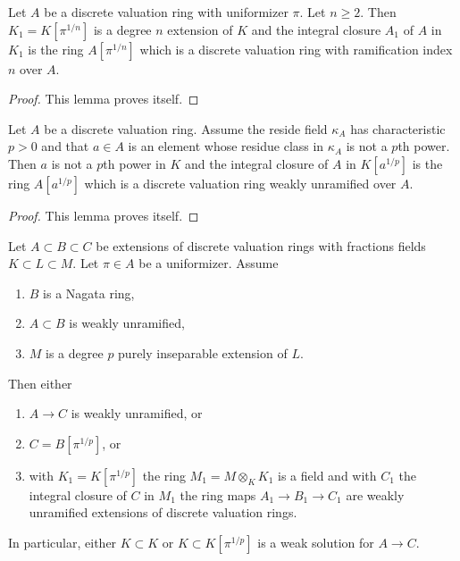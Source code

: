 \begin{lemma}
\label{lemma-pull-root-uniformizer}
Let $A$ be a discrete valuation ring with uniformizer $\pi$.
Let $n \geq 2$. Then $K_1 = K[\pi^{1/n}]$ is a degree $n$ extension of $K$
and the integral closure $A_1$ of $A$ in $K_1$ is the ring $A[\pi^{1/n}]$
which is a discrete valuation ring with ramification index $n$ over $A$.
\end{lemma}

\begin{proof}
This lemma proves itself.
\end{proof}

\begin{lemma}
\label{lemma-pre-purely-inseparable-case}
Let $A$ be a discrete valuation ring. Assume the reside field $\kappa_A$ has
characteristic $p > 0$ and that $a \in A$ is an element whose residue
class in $\kappa_A$ is not a $p$th power. Then $a$ is not a $p$th power in $K$
and the integral closure of $A$ in $K[a^{1/p}]$ is the ring $A[a^{1/p}]$
which is a discrete valuation ring weakly unramified over $A$.
\end{lemma}

\begin{proof}
This lemma proves itself.
\end{proof}

\begin{lemma}
\label{lemma-purely-inseparable-case}
Let $A \subset B \subset C$ be extensions of discrete valuation rings
with fractions fields $K \subset L \subset M$. Let $\pi \in A$ be a
uniformizer. Assume
\begin{enumerate}
\item $B$ is a Nagata ring,
\item $A \subset B$ is weakly unramified,
\item $M$ is a degree $p$ purely inseparable extension of $L$.
\end{enumerate}
Then either
\begin{enumerate}
\item $A \to C$ is weakly unramified, or
\item $C = B[\pi^{1/p}]$, or
\item with $K_1 = K[\pi^{1/p}]$ the ring
$M_1 = M \otimes_K K_1$ is a field and with $C_1$ the integral
closure of $C$ in $M_1$ the ring maps $A_1 \to B_1 \to C_1$
are weakly unramified extensions of discrete valuation rings.
\end{enumerate}
In particular, either $K \subset K$ or $K \subset K[\pi^{1/p}]$
is a weak solution for $A \to C$.
\end{lemma}

